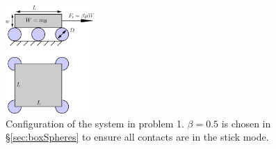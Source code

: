 \begin{figure}[H]
	\begin{center}
		\includegraphics[width=0.3\textwidth]{images/CD/Box_Spheres_1.png}
	\end{center}
	\caption{Configuration of the system in problem 1. $\beta=0.5$ is chosen in \S\ref{sec:boxSpheres} to ensure all contacts are in the stick mode.}\label{fig:p1}
\end{figure}

